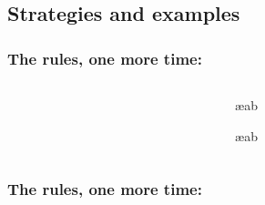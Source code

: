 \begin{frame}
  \begin{fitchproof}
    \open
    \open
    \open
    \close
    \close
    \close
  \end{fitchproof}
\end{frame}


\newhourlecture

\subsection{Strategies and examples}

\begin{frame}
  \frametitle{The rules, one more time: \eand}
\begin{columns}
  \begin{column}{3cm}
  \begin{fitchproof}
     
  \end{fitchproof}
\end{column}
\begin{column}{3cm}
  \begin{fitchproof}
     \ae{ab}
  \end{fitchproof}
  \begin{fitchproof}
     \ae{ab}
  \end{fitchproof}
\end{column}
\end{columns}
\end{frame}

\begin{frame}
  \frametitle{The rules, one more time: \eif}
\begin{columns}
  \begin{column}{3cm}
    \begin{fitchproof}
      \open
      \ellipsesline
      \close
       
    \end{fitchproof}
  \end{column}
  \begin{column}{3cm}
    \begin{fitchproof}
       
    \end{fitchproof}
  \end{column}
\end{columns}
\end{frame}

